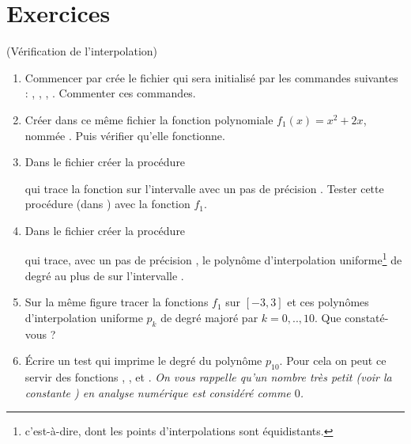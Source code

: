 \documentclass[a4paper,12pt,reqno]{amsart}
\begin{document}
\section{Exercices}

\begin{exo} (Vérification de l'interpolation)

  \begin{enumerate}
    \item Commencer par crée le fichier  qui sera initialisé par les commandes suivantes : , , , . Commenter ces commandes.

    \item Créer dans ce même fichier la fonction polynomiale $f_{1}(x)=x^{2}+2x$, nommée . Puis vérifier qu'elle fonctionne.

    \item Dans le fichier  créer la procédure
    \begin{center}
    \end{center}
    qui trace la fonction  sur l'intervalle \mtlb{[-a,a]} avec un pas de précision . Tester cette procédure (dans ) avec la fonction $f_{1}$.

    \item Dans le fichier  créer la procédure
    \begin{center}
    \end{center}
    qui trace, avec un pas de précision , le polynôme d'interpolation uniforme\footnote{c'est-à-dire, dont les points d'interpolations sont équidistants.} de degré au plus  de  sur l'intervalle \mtlb{[-a,a]}.

    \item Sur la même figure tracer la fonctions $f_{1}$ sur $[-3,3]$ et ces polynômes d'interpolation uniforme $p_{k}$ de degré majoré par $k=0,..,10$. Que constaté-vous ?

    \item Écrire un test qui imprime le degré du polynôme $p_{10}$. Pour cela on peut ce servir des fonctions , , et .\newline
    \textit{On vous rappelle qu'un nombre très petit (voir la constante ) en analyse numérique est considéré comme $0$.}


  \end{enumerate}
\end{exo}
\end{document}
